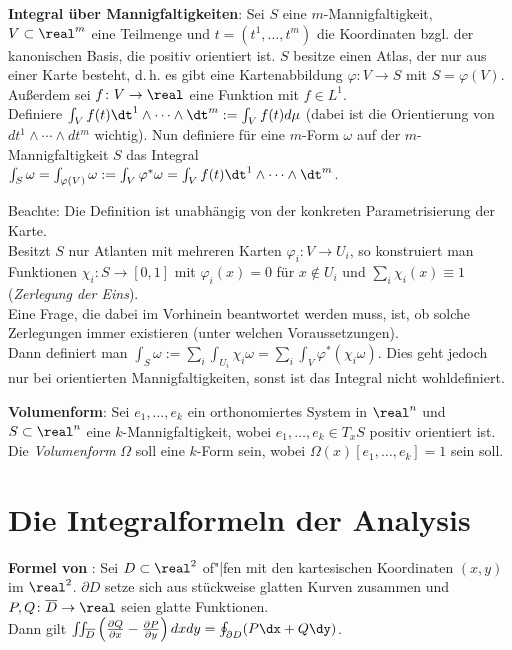 \textbf{Integral über Mannigfaltigkeiten}:
Sei $S$ eine $m$-Mannigfaltigkeit, $V \subset \real^m$ eine Teilmenge und
$t = (t^1, \dotsc, t^m)$ die Koordinaten bzgl. der kanonischen Basis,
die positiv orientiert ist.
$S$ besitze einen Atlas, der nur aus einer Karte besteht, d.\,h.
es gibt eine Kartenabbildung $\varphi\colon V \rightarrow S$
mit $S = \varphi(V)$.
Außerdem sei $f\colon V \rightarrow \real$ eine Funktion mit $f \in L^1$. \\
Definiere $\int_V f(t) \dt^1 \land \dotsb \land \dt^m :=
\int_V f(t) d\mu$ (dabei ist die Orientierung von
$dt^1 \land \dotsb \land dt^m$ wichtig).
Nun definiere für eine $m$-Form $\omega$ auf der $m$-Mannigfaltigkeit $S$ das
Integral \\
$\int_S \omega = \int_{\varphi(V)} \omega := \int_V \varphi^\ast \omega =
\int_V f(t) \dt^1 \land \dotsb \land \dt^m$.

Beachte: Die Definition ist unabhängig von der konkreten Parametrisierung
der Karte. \\
Besitzt $S$ nur Atlanten mit mehreren Karten
$\varphi_i\colon V \rightarrow U_i$, so konstruiert man Funktionen
$\chi_i\colon S \rightarrow [0, 1]$ mit $\varphi_i(x) = 0$ für $x \notin U_i$
und $\sum_i \chi_i(x) \equiv 1$ (\emph{Zerlegung der Eins}). \\
Eine Frage, die dabei im Vorhinein beantwortet werden muss, ist, ob solche
Zerlegungen immer existieren (unter welchen Voraussetzungen). \\
Dann definiert man $\int_S \omega := \sum_i \int_{U_i} \chi_i \omega =
\sum_i \int_V \varphi^\ast(\chi_i \omega)$.
Dies geht jedoch nur bei orientierten Mannigfaltigkeiten, sonst ist das
Integral nicht wohldefiniert.

\linie

\textbf{Volumenform}:
Sei $e_1, \dotsc, e_k$ ein orthonomiertes System in $\real^n$ und
$S \subset \real^n$ eine $k$-Mannigfal\-tigkeit, wobei
$e_1, \dotsc, e_k \in T_x S$ positiv orientiert ist.
Die \emph{Volumenform} $\Omega$ soll eine $k$-Form sein, wobei
$\Omega(x)[e_1, \dotsc, e_k] = 1$ sein soll.

\pagebreak

\section{%
    Die Integralformeln der Analysis%
}

\textbf{Formel von }:
Sei $D \subset \real^2$ of"|fen mit den kartesischen Koordinaten $(x, y)$
im $\real^2$.
$\partial D$ setze sich aus stückweise glatten Kurven zusammen und
$P, Q\colon \overline{D} \rightarrow \real$ seien glatte Funktionen. \\
Dann gilt $\iint_{\overline{D}} \left(\frac{\partial Q}{\partial x} -
\frac{\partial P}{\partial y}\right) dxdy = \oint_{\partial D} (P\dx + Q\dy)$.

